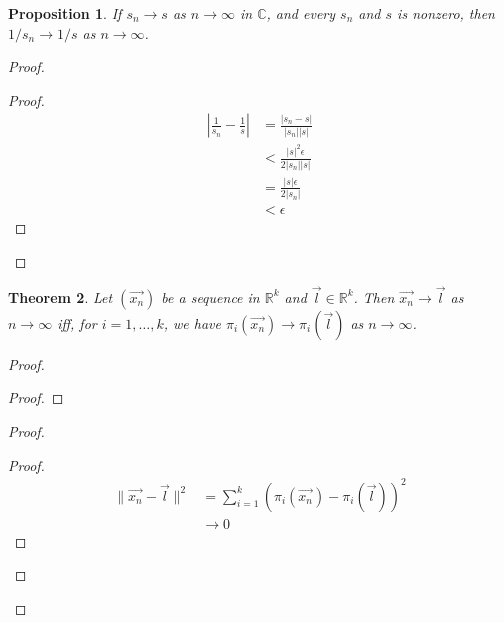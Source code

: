 \documentclass{book}
\let\qed\relax
\newtheorem{prop}{Proposition}[chapter]
\newtheorem{thm}[prop]{Theorem}
\theoremstyle{definition}
\begin{document}
\begin{prop}
If $s_n \rightarrow s$ as $n \rightarrow \infty$ in $\mathbb{C}$, and every $s_n$ and $s$ is nonzero, then $1/s_n \rightarrow 1/s$ as $n \rightarrow \infty$.
\end{prop}

\begin{proof}
\pf
{}
\begin{proof}
	\pf
	\begin{align*}
		\left| \frac{1}{s_n} - \frac{1}{s} \right|
		& = \frac{|s_n - s|}{|s_n||s|} \\
		& < \frac{|s|^2 \epsilon}{2 |s_n| |s|} \\
		& = \frac{|s| \epsilon}{2 |s_n|} \\
		& < \epsilon
	\end{align*}
\end{proof}
\qed
\end{proof}

\begin{thm}
Let $(\vec{x_n})$ be a sequence in $\mathbb{R}^k$ and $\vec{l} \in \mathbb{R}^k$. Then $\vec{x_n} \rightarrow \vec{l}$ as $n \rightarrow \infty$ iff, for $i = 1, \ldots, k$, we have $\pi_i(\vec{x_n}) \rightarrow \pi_i(\vec{l})$ as $n \rightarrow \infty$.
\end{thm}

\begin{proof}
\pf
{}
\begin{proof}
\end{proof}
\begin{proof}
	\begin{proof}
		\pf
		\begin{align*}
			\| \vec{x_n} - \vec{l} \|^2
			& = \sum_{i=1}^k (\pi_i(\vec{x_n}) - \pi_i(\vec{l}))^2 \\
			& \rightarrow 0
		\end{align*}
	\end{proof}
\end{proof}
\qed
\end{proof}
\end{document}

